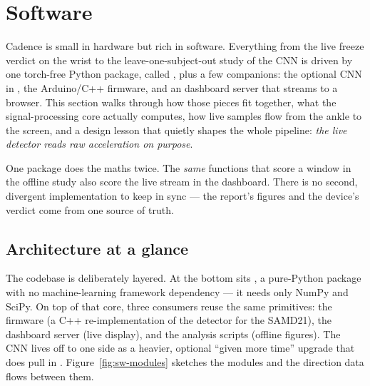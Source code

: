 \section{Software}
\label{sec:software}

Cadence is small in hardware but rich in software. Everything from the live freeze
verdict on the wrist to the leave-one-subject-out study of the CNN is driven by one
torch-free Python package, called , plus a few companions: the optional CNN
in , the Arduino/C++ firmware, and an  dashboard server
that streams to a browser. This section walks through how those pieces fit together,
what the signal-processing core actually computes, how live samples flow from the
ankle to the screen, and a design lesson that quietly shapes the whole pipeline:
\emph{the live detector reads raw acceleration on purpose}.

\begin{keyidea}
One package does the maths twice. The \emph{same}  functions that score
a window in the offline study also score the live stream in the dashboard. There is no
second, divergent implementation to keep in sync --- the report's figures and the
device's verdict come from one source of truth.
\end{keyidea}

\subsection{Architecture at a glance}

The codebase is deliberately layered. At the bottom sits , a pure-Python
package with no machine-learning framework dependency --- it needs only NumPy and
SciPy. On top of that core, three consumers reuse the same primitives: the firmware
(a C++ re-implementation of the detector for the SAMD21), the dashboard server (live
display), and the analysis scripts (offline figures). The CNN lives off to one side as
a heavier, optional ``given more time'' upgrade that does pull in .
Figure~\ref{fig:sw-modules} sketches the modules and the direction data flows between
them.

